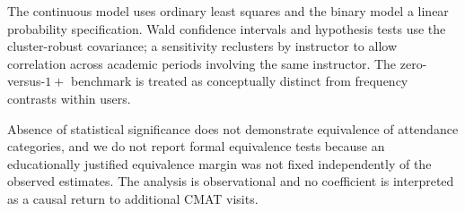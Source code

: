 The continuous model uses ordinary least squares and the binary model a linear probability specification. Wald confidence intervals and hypothesis tests use the cluster-robust covariance; a sensitivity reclusters by instructor to allow correlation across academic periods involving the same instructor. The zero-versus-$1+$ benchmark is treated as conceptually distinct from frequency contrasts within users.

Absence of statistical significance does not demonstrate equivalence of attendance categories, and we do not report formal equivalence tests because an educationally justified equivalence margin was not fixed independently of the observed estimates. The analysis is observational and no coefficient is interpreted as a causal return to additional CMAT visits.

